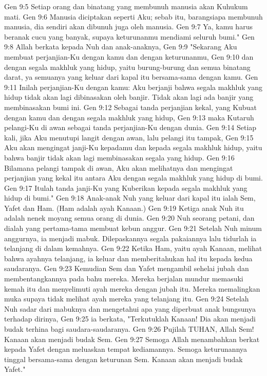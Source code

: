 Gen 9:5  Setiap orang dan binatang yang membunuh manusia akan Kuhukum mati.
Gen 9:6  Manusia diciptakan seperti Aku; sebab itu, barangsiapa membunuh manusia, dia sendiri akan dibunuh juga oleh manusia.
Gen 9:7  Ya, kamu harus beranak cucu yang banyak, supaya keturunanmu mendiami seluruh bumi."
Gen 9:8  Allah berkata kepada Nuh dan anak-anaknya,
Gen 9:9  "Sekarang Aku membuat perjanjian-Ku dengan kamu dan dengan keturunanmu,
Gen 9:10  dan dengan segala makhluk yang hidup, yaitu burung-burung dan semua binatang darat, ya semuanya yang keluar dari kapal itu bersama-sama dengan kamu.
Gen 9:11  Inilah perjanjian-Ku dengan kamu: Aku berjanji bahwa segala makhluk yang hidup tidak akan lagi dibinasakan oleh banjir. Tidak akan lagi ada banjir yang membinasakan bumi ini.
Gen 9:12  Sebagai tanda perjanjian kekal, yang Kubuat dengan kamu dan dengan segala makhluk yang hidup,
Gen 9:13  maka Kutaruh pelangi-Ku di awan sebagai tanda perjanjian-Ku dengan dunia.
Gen 9:14  Setiap kali, jika Aku menutupi langit dengan awan, lalu pelangi itu tampak,
Gen 9:15  Aku akan mengingat janji-Ku kepadamu dan kepada segala makhluk hidup, yaitu bahwa banjir tidak akan lagi membinasakan segala yang hidup.
Gen 9:16  Bilamana pelangi tampak di awan, Aku akan melihatnya dan mengingat perjanjian yang kekal itu antara Aku dengan segala makhluk yang hidup di bumi.
Gen 9:17  Itulah tanda janji-Ku yang Kuberikan kepada segala makhluk yang hidup di bumi."
Gen 9:18  Anak-anak Nuh yang keluar dari kapal itu ialah Sem, Yafet dan Ham. (Ham adalah ayah Kanaan.)
Gen 9:19  Ketiga anak Nuh itu adalah nenek moyang semua orang di dunia.
Gen 9:20  Nuh seorang petani, dan dialah yang pertama-tama membuat kebun anggur.
Gen 9:21  Setelah Nuh minum anggurnya, ia menjadi mabuk. Dilepaskannya segala pakaiannya lalu tidurlah ia telanjang di dalam kemahnya.
Gen 9:22  Ketika Ham, yaitu ayah Kanaan, melihat bahwa ayahnya telanjang, ia keluar dan memberitahukan hal itu kepada kedua saudaranya.
Gen 9:23  Kemudian Sem dan Yafet mengambil sehelai jubah dan membentangkannya pada bahu mereka. Mereka berjalan mundur memasuki kemah itu dan menyelimuti ayah mereka dengan jubah itu. Mereka memalingkan muka supaya tidak melihat ayah mereka yang telanjang itu.
Gen 9:24  Setelah Nuh sadar dari mabuknya dan mengetahui apa yang diperbuat anak bungsunya terhadap dirinya,
Gen 9:25  ia berkata, "Terkutuklah Kanaan! Dia akan menjadi budak terhina bagi saudara-saudaranya.
Gen 9:26  Pujilah TUHAN, Allah Sem! Kanaan akan menjadi budak Sem.
Gen 9:27  Semoga Allah menambahkan berkat kepada Yafet dengan meluaskan tempat kediamannya. Semoga keturunannya tinggal bersama-sama dengan keturunan Sem. Kanaan akan menjadi budak Yafet."
